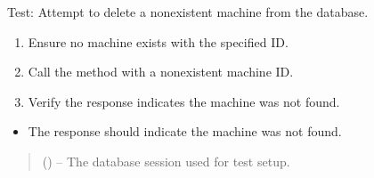 \documentclass[letterpaper,10pt,english]{sphinxmanual}
\begin{document}

\begin{fulllineitems}
\label{\detokenize{test:test.test_machine.test_delete_machine_not_found}}
\pysigstartsignatures
\pysiglinewithargsret
{}
{}
{}
\pysigstopsignatures
\sphinxAtStartPar
Test: Attempt to delete a non\sphinxhyphen{}existent machine from the database.
\begin{description}
\begin{enumerate}
%
\item {} 
\sphinxAtStartPar
Ensure no machine exists with the specified ID.

\item {} 
\sphinxAtStartPar
Call the  method with a non\sphinxhyphen{}existent machine ID.

\item {} 
\sphinxAtStartPar
Verify the response indicates the machine was not found.

\end{enumerate}

\begin{itemize}
\item {} 
\sphinxAtStartPar
The response should indicate the machine was not found.

\end{itemize}

\end{description}
\begin{quote}\begin{description}
\sphinxAtStartPar
{} () – The database session used for test setup.

\end{description}\end{quote}

\end{fulllineitems}

\end{document}
